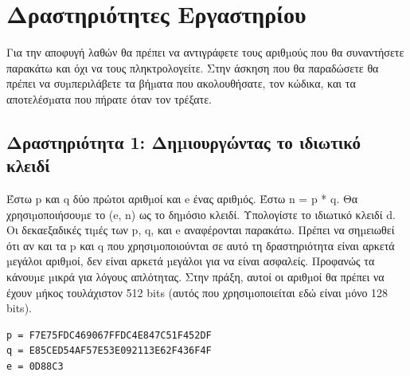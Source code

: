 \section{Δραστηριότητες Εργαστηρίου}
\noindent
Για την αποφυγή λαθών θα πρέπει να αντιγράφετε τους αριθµούς που θα συναντήσετε
παρακάτω και όχι να τους πληκτρολογείτε. Στην άσκηση που θα παραδώσετε θα πρέπει να
συµπεριλάβετε τα βήµατα που ακολουθήσατε, τον κώδικα, και τα αποτελέσµατα που πήρατε
όταν τον τρέξατε.

\subsection{Δραστηριότητα 1: Δηµιουργώντας το ιδιωτικό κλειδί}
\noindent
Έστω p και q δύο πρώτοι αριθµοί και e ένας αριθµός. Έστω n = p * q. Θα χρησιµοποιήσουµε το
(e, n) ως το δηµόσιο κλειδί. Υπολογίστε το ιδιωτικό κλειδί d. Οι δεκαεξαδικές τιµές των p, q, και
e αναφέρονται παρακάτω. Πρέπει να σηµειωθεί ότι αν και τα p και q που χρησιµοποιούνται σε
αυτό τη δραστηριότητα είναι αρκετά µεγάλοι αριθµοί, δεν είναι αρκετά µεγάλοι για να είναι
ασφαλείς. Προφανώς τα κάνουµε µικρά για λόγους απλότητας. Στην πράξη, αυτοί οι αριθµοί
θα πρέπει να έχουν µήκος τουλάχιστον 512 bits (αυτός που χρησιµοποιείται εδώ είναι µόνο 128
bits).

\begin{lstlisting}	
p = F7E75FDC469067FFDC4E847C51F452DF
q = E85CED54AF57E53E092113E62F436F4F
e = 0D88C3
\end{lstlisting}


